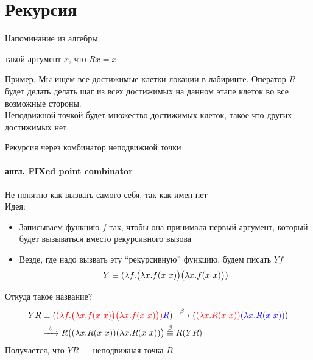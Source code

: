 \section{Рекурсия}

\begin{frame}{Напоминание из алгебры}
\begin{definition}
такой аргумент $x$, что $Rx = x $
\end{definition}
\vspace{2em}
Пример. Мы ищем все достижимые клетки-локации в лабиринте. Оператор $R$ будет делать делать шаг из всех достижимых на данном этапе клеток во все возможные стороны.\\
Неподвижной точкой будет множество достижимых клеток, такое что других достижимых нет.
\end{frame}


\newcommand\Y{\ensuremath{Y}}
\begin{frame}{Рекурсия через комбинатор неподвижной точки}
\framesubtitle{англ. FIXed point combinator}
\def\Yimpl{\ensuremath{\lam{f}{\Lam{x}{f(x\ x)}\Lam{x}{f(x\ x)}}}}
Не понятно как вызвать самого себя, так как имен нет\\

Идея:
\begin{itemize}
  \item Записываем функцию $f$ так, чтобы она принимала первый аргумент, который будет вызываться вместо рекурсивного вызова
  \item Везде, где надо вызвать эту \enquote{рекурсивную} функцию, будем писать $Yf$
\vspace{-0.5em}
  {\Large\begin{align*}
     Y\equiv \Yimpl
  \end{align*}}
\end{itemize}

Откуда такое название?
\begin{align*}
YR &\equiv     \redex{\Yimpl}{R} \arrbeta \redex{\lam{x}{R(x\ x)}}{\lam{x}{R(x\ x)}} \\
&\arrbeta  R\big( \lam{x}{R(x\ x)}\lam{x}{R(x\ x)} \big)   \overset{\beta}{\equiv} R(YR)
\end{align*}
Получается, что $YR$ --- неподвижная точка $R$
\end{frame}


\newcommand{\ite}[3]{\ensuremath{\big{(}\text{\textbf{if }} #1\text{\textbf{ then }}#2\text{\textbf{ else }}#3}\big{)}}
\newcommand{\FIX}{\texttt{FIX}}
\newcommand{\self}{\ensuremath{self}}

